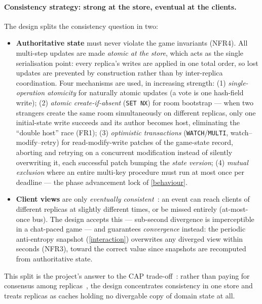 \documentclass{scrartcl}
\begin{document}
\paragraph{Consistency strategy: strong at the store, eventual at the clients.}
The design splits the consistency question in two:
\begin{itemize}
      \item \textbf{Authoritative state} must never violate the game invariants
            (NFR4). All multi-step updates are made \emph{atomic at the store}, which acts
            as the single serialisation point: every replica's writes are applied in one
            total order, so lost updates are prevented by construction rather than by
            inter-replica coordination. Four mechanisms are used, in increasing strength:
            (1) \emph{single-operation atomicity} for naturally atomic updates (a vote is
            one hash-field write); (2) \emph{atomic create-if-absent} (\texttt{SET NX}) for
            room bootstrap --- when two strangers create the same room simultaneously on
            different replicas, only one initial-state write succeeds and its author becomes
            host, eliminating the ``double host'' race (FR1); (3) \emph{optimistic
                  transactions} (\texttt{WATCH}/\texttt{MULTI}, watch--modify--retry) for
            read-modify-write patches of the game-state record, aborting and retrying on a
            concurrent modification instead of silently overwriting it, each successful
            patch bumping the \emph{state version}; (4) \emph{mutual exclusion} where an
            entire multi-key procedure must run at most once per deadline --- the phase
            advancement lock of \cref{behaviour}.
      \item \textbf{Client views} are only \emph{eventually
                  consistent}~\cite{vogels2009eventually}: an event can reach clients of different
            replicas at slightly different times, or be missed entirely (at-most-once bus).
            The design accepts this --- sub-second divergence is imperceptible in a
            chat-paced game --- and guarantees \emph{convergence} instead: the periodic
            anti-entropy snapshot (\cref{interaction}) overwrites any diverged view within
            seconds (NFR3), toward the correct value since snapshots are recomputed from
            authoritative state.
\end{itemize}
This split is the project's answer to the CAP trade-off~\cite{gilbert2002brewer}:
rather than paying for consensus among
replicas~\cite{fischer1985impossibility}, the design concentrates consistency in
one store and treats replicas as caches holding no divergable copy of domain
state at all.
\end{document}
